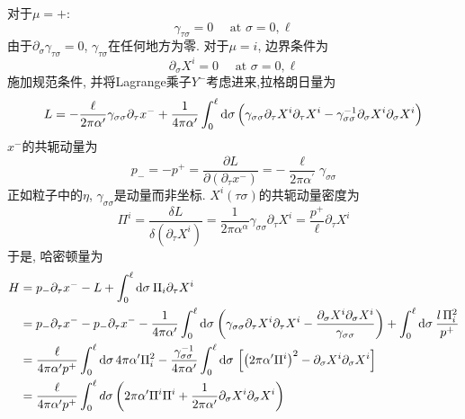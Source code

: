 \noindent 对于$\mu=+$:
\begin{equation}
\gamma_{\tau \sigma}=0 \quad \text { at } \sigma=0, \ell
\end{equation}
由于$\partial_\sigma\gamma_{\tau\sigma}=0$, $\gamma_{\tau\sigma}$在任何地方为零. 
对于$\mu=i$, 边界条件为
\begin{equation}
\partial_{\sigma} X^{i}=0 \quad \text { at } \sigma=0, \ell   \label{bound-mu-i}
\end{equation}
施加规范条件, 并将Lagrange乘子$Y^-$考虑进来,拉格朗日量为
\begin{equation}
L=-\frac{\ell}{2 \pi \alpha^{\prime}} \gamma_{\sigma \sigma} \partial_{\tau} x^{-}+\frac{1}{4 \pi \alpha^{\prime}} \int_{0}^{\ell} \mathrm{d}\sigma\,\Bigl(\gamma_{\sigma \sigma} \partial_{\tau} X^{i} \partial_{\tau} X^{i}-\gamma_{\sigma \sigma}^{-1} \partial_{\sigma} X^{i} \partial_{\sigma} X^{i}\Bigr)
\end{equation}
$x^-$的共轭动量为
\begin{equation}
p_{-}=-p^{+}=\frac{\partial L}{\partial\left(\partial_{\tau} x^{-}\right)}=-\frac{\ell}{2 \pi \alpha^{\prime}} \gamma_{\sigma \sigma}
\end{equation}
正如粒子中的$\eta$, $\gamma_{\sigma\sigma}$是动量而非坐标. $X^i(\tau\sigma)$的共轭动量密度为
\begin{equation}
\Pi^{i}=\frac{\delta L}{\delta\left(\partial_{\tau} X^{i}\right)}=\frac{1}{2 \pi \alpha^{\alpha}} \gamma_{\sigma \sigma} \partial_{\tau} X^{i}=\frac{p^{+}}{\ell} \partial_{\tau} X^{i} \label{1.3.18}
\end{equation}
于是, 哈密顿量为
\begin{align}
H &=p_{-} \partial_{\tau} x^{-}-L+\int_{0}^{\ell} \mathrm{d} \sigma\: \Pi_{i} \partial_{\tau} X^{i} \nonumber \\
&= p_{-} \partial_{\tau}  x^{-}-p_{-} \partial_{\tau} x^{-} -\frac{1}{4 \pi \alpha^{\prime}} \int_{0}^{\ell} \mathrm{d} \sigma\:\biggl(\gamma_{\sigma \sigma} \partial_{\tau} X^{i} \partial_{\tau} X^{i}-\frac{\partial_{\sigma} X^{i} \partial_{\sigma} X^{i}}{\gamma_{\sigma \sigma}}\biggr) 
+\int_{0}^{\ell} \mathrm{d} \sigma\: \frac{l\,\Pi_{i}^{2} }{ p^{+}} \nonumber \\
&=\frac{\ell}{4 \pi \alpha^{\prime} p^{+}} \int_{0}^{\ell} \mathrm{d} \sigma\, 4 \pi \alpha^{\prime}\Pi_{i}^{2} -\frac{\gamma_{\sigma\sigma}^{-1}}{4 \pi \alpha^{\prime}} \int_{0}^{\ell} \mathrm{d} \sigma\,\left[\left(2 \pi \alpha^{\prime} \Pi^{i}\right)^{2}-\partial_\sigma X^{i} \partial _\sigma X^{i}\right] \nonumber \\
&=\frac{\ell}{4 \pi \alpha^{\prime} p^{+}} \int_{0}^{\ell} d \sigma\left(2 \pi \alpha^{\prime} \Pi^{i} \Pi^{i}+\frac{1}{2 \pi \alpha^{\prime}} \partial_{\sigma} X^{i} \partial_{\sigma} X^{i}\right) \label{1.3.19}
\end{align}
